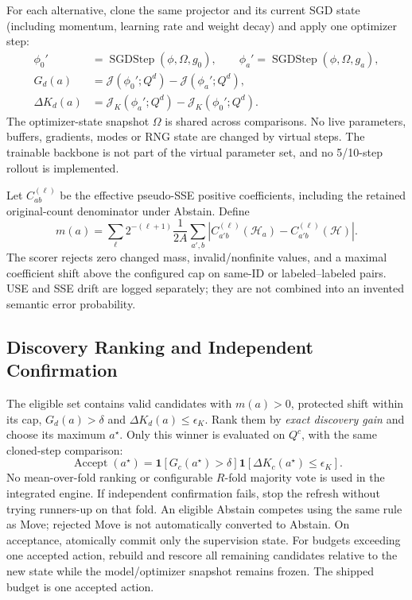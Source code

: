 \documentclass[conference]{IEEEtran}
\newcommand{\Jcal}{\mathcal J}
\newcommand{\ind}{\mathbf{1}}
\begin{document}
For each alternative, clone the same projector and its current SGD state (including momentum, learning rate and weight decay) and apply one optimizer step:
\begin{align}
\phi_0'&=\operatorname{SGDStep}(\phi,\Omega,g_0),\qquad
\phi_a'=\operatorname{SGDStep}(\phi,\Omega,g_a),\\
G_d(a)&=\Jcal(\phi_0';Q^d)-\Jcal(\phi_a';Q^d),\\
\Delta K_d(a)&=\Jcal_K(\phi_a';Q^d)-\Jcal_K(\phi_0';Q^d).
\end{align}
The optimizer-state snapshot $\Omega$ is shared across comparisons. No live parameters, buffers, gradients, modes or RNG state are changed by virtual steps. The trainable backbone is not part of the virtual parameter set, and no 5/10-step rollout is implemented.

Let $C_{ab}^{(\ell)}$ be the effective pseudo-SSE positive coefficients, including the retained original-count denominator under Abstain. Define
\begin{equation}
m(a)=\sum_\ell2^{-(\ell+1)}\frac1{2A}
\sum_{a',b}|C_{a'b}^{(\ell)}(\mathcal H_a)-C_{a'b}^{(\ell)}(\mathcal H)|.
\end{equation}
The scorer rejects zero changed mass, invalid/nonfinite values, and a maximal coefficient shift above the configured cap on same-ID or labeled--labeled pairs. USE and SSE drift are logged separately; they are not combined into an invented semantic error probability.

\subsection{Discovery Ranking and Independent Confirmation}\label{sec:acceptance}
The eligible set contains valid candidates with $m(a)>0$, protected shift within its cap, $G_d(a)>\delta$ and $\Delta K_d(a)\le\epsilon_K$. Rank them by \emph{exact discovery gain} and choose its maximum $a^\star$. Only this winner is evaluated on $Q^c$, with the same cloned-step comparison:
\begin{equation}\label{eq:accept}
\operatorname{Accept}(a^\star)=
\ind[G_c(a^\star)>\delta]\ind[\Delta K_c(a^\star)\le\epsilon_K].
\end{equation}
No mean-over-fold ranking or configurable $R$-fold majority vote is used in the integrated engine. If independent confirmation fails, stop the refresh without trying runners-up on that fold. An eligible Abstain competes using the same rule as Move; rejected Move is not automatically converted to Abstain. On acceptance, atomically commit only the supervision state. For budgets exceeding one accepted action, rebuild and rescore all remaining candidates relative to the new state while the model/optimizer snapshot remains frozen. The shipped budget is one accepted action.
\end{document}
